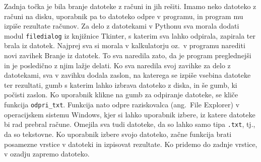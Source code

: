 \documentclass[12pt]{article}
\begin{document}
	Zadnja točka je bila branje datoteke z računi in jih rešiti. Imamo neko datoteko z računi na disku,
	uporabnik pa to datoteko odpre v programu, in program mu izpiše rezultate računov. Za delo z datotekami v 
	Pythonu sva morala dodati modul \texttt{filedialog} iz knjižnice Tkinter, s katerim sva lahko odpirala, zapirala ter
	brala iz datotek. Najprej sva si morala v kalkulatorju oz.~v programu narediti novi zavihek Branje iz datotek.
	To sva naredila zato, da je program preglednejši in je posledično z njim lažje delati. Ko sva naredila svoj zavihke za
	delo z datotekami, sva v zavihku dodala zaslon, na katerega se izpiše vsebina datoteke ter rezultati, gumb s 
	katerim lahko izbrava datoteko z diska, in še gumb, ki počisti zaslon. Ko uporabnik klikne na gumb
	za odpiranje datoteke, se kliče funkcija \texttt{odpri\_txt}. Funkcija nato odpre raziskovalca (ang.~File Explorer) v
	operacijskem sistemu Windows, kjer si lahko uporabnik izbere, iz katere datoteke bi rad prebral račune. Omejila sva
	tudi datoteke, da so lahko samo tipa \texttt{.txt}, tj., da so tekstovne. Ko uporabnik izbere svojo datoteko, začne funkcija\cite{read} brati posamezne vrstice v datoteki in izpisovat rezultate. Ko pridemo do zadnje vrstice, v ozadju zapremo datoteko.

	
	\pagebreak
	
	\printbibliography
	
\end{document}
